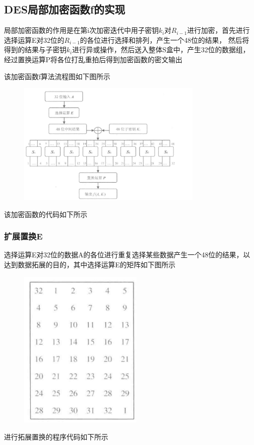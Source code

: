 \documentclass[a4paper,11pt,UTF8]{ctexart}
\newcommand{\bottomcaption}{%
\setlength{\abovecaptionskip}{6pt}%
\setlength{\belowcaptionskip}{6pt}%
\caption}
\newcommand{\xiaowuhao}{\fontsize{9pt}{\baselineskip}\selectfont}   %
\begin{document}
    \subsection{DES局部加密函数f的实现}
        局部加密函数的作用是在第i次加密迭代中用子密钥$k_{i}$对$R_{i-1}$进行加密，首先进行选择运算E对32位的$R_{i-1}$的各位进行选择和排列，产生一个48位的结果，
        然后将得到的结果与子密钥$k_{i}$进行异或操作，然后送入整体S盒中，产生32位的数据组，经过置换运算P将各位打乱重拍后得到加密函数的密文输出\par
        该加密函数f算法流程图如下图所示    
        \begin{figure}[H]
            \centering
            \includegraphics[width=9cm]{f.jpg}
            \bottomcaption{\xiaowuhao{加密函数f}}
        \end{figure}
        该加密函数的代码如下所示
        

        \subsubsection{扩展置换E}
            选择运算E对32位的数据A的各位进行重复选择某些数据产生一个48位的结果，以达到数据拓展的目的，其中选择运算E的矩阵如下图所示
            \begin{figure}[H]
                \centering
                \includegraphics[width=6cm]{E.jpg}
                \bottomcaption{\xiaowuhao{拓展置换矩阵}}
            \end{figure}
            进行拓展置换的程序代码如下所示
            
\end{document}
